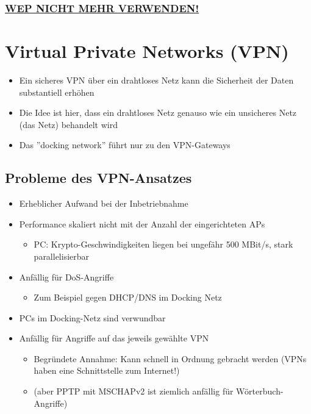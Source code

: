\documentclass[openany]{book}
\begin{document}
\subsubsection{\underline{WEP NICHT MEHR VERWENDEN!}}

\newpage

\section{Virtual Private Networks (VPN)}

\begin{itemize}
    \item Ein sicheres VPN über ein drahtloses Netz kann die Sicherheit der Daten substantiell erhöhen
    \item Die Idee ist hier, dass ein drahtloses Netz genauso wie ein unsicheres Netz (das Netz) behandelt wird
    \item Das ''docking network'' führt nur zu den VPN-Gateways 
\end{itemize}

\subsection{Probleme des VPN-Ansatzes}

\begin{itemize}
    \item Erheblicher Aufwand bei der Inbetriebnahme
    \item Performance skaliert nicht mit der Anzahl der eingerichteten APs
    \begin{itemize}
        \item PC: Krypto-Geschwindigkeiten liegen bei ungefähr 500 MBit/s, stark parallelisierbar
    \end{itemize}
    \item Anfällig für DoS-Angriffe
    \begin{itemize}
        \item Zum Beispiel gegen DHCP/DNS im Docking Netz
    \end{itemize}
    \item PCs im Docking-Netz sind verwundbar
    \item Anfällig für Angriffe auf das jeweils gewählte VPN
    \begin{itemize}
        \item Begründete Annahme: Kann schnell in Ordnung gebracht werden (VPNs haben eine Schnittstelle zum Internet!)
        \item (aber PPTP mit MSCHAPv2 ist ziemlich anfällig für Wörterbuch-Angriffe)
    \end{itemize}
\end{itemize}
\end{document}
